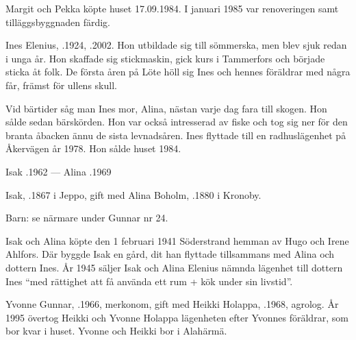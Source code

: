 Margit och Pekka köpte huset 17.09.1984. I januari 1985 var renoveringen samt tilläggsbyggnaden färdig.


%
Ines Elenius, .1924, .2002. Hon utbildade sig till sömmerska, men blev sjuk redan i unga år. Hon skaffade sig stickmaskin, gick kurs i Tammerfors och började sticka åt folk. De första åren på Löte höll sig Ines och hennes föräldrar med några får, främst för ullens skull.

Vid bärtider såg man Ines mor, Alina, nästan varje dag fara till skogen. Hon sålde sedan bärskörden. Hon var också intresserad av fiske och tog sig ner för den branta åbacken ännu de sista levnadsåren. Ines flyttade till en radhuslägenhet på Åkervägen år 1978. Hon sålde huset 1984.

Isak .1962  ---  Alina .1969


%
Isak, .1867 i Jeppo, gift med Alina Boholm, .1880 i Kronoby.

Barn: se närmare under Gunnar nr 24.

Isak och Alina köpte den 1 februari 1941 Söderstrand hemman av Hugo och Irene Ahlfors. Där byggde Isak en gård, dit han flyttade tillsammans med Alina och dottern Ines. År 1945 säljer Isak och Alina Elenius nämnda lägenhet till dottern Ines 	``med rättighet att få använda ett rum + kök under sin livstid''.



%



%
Yvonne Gunnar, .1966, merkonom, gift med Heikki Holappa, .1968, agrolog. År 1995 övertog Heikki och Yvonne Holappa lägenheten efter Yvonnes föräldrar, som bor kvar i huset. Yvonne och Heikki bor i Alahärmä.
\begin{jhchildren}
  \item {}
  \item {}
  \item {}
  \item {}
  \item {}
\end{jhchildren}

